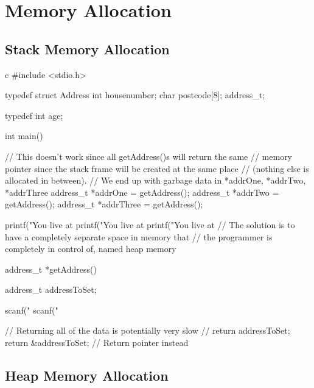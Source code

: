 \section{Memory Allocation}\label{sec:memory_allocation}

\subsection{Stack Memory Allocation}\label{sub:stack_memory_allocation}

\begin{code}{c}
    #include <stdio.h>

    typedef struct Address {
        int housenumber;
        char postcode[8];
    } address_t;

    typedef int age;

    int main() {
        // This doesn't work since all getAddress()s will return the same
        // memory pointer since the stack frame will be created at the same place
        // (nothing else is allocated in between).
        // We end up with garbage data in *addrOne, *addrTwo, *addrThree
        address_t *addrOne = getAddress();
        address_t *addrTwo = getAddress();
        address_t *addrThree = getAddress();

        printf("You live at %
        printf("You live at %
        printf("You live at %
        // The solution is to have a completely separate space in memory that
        // the programmer is completely in control of, named heap memory
    }

    address_t *getAddress() {
        address_t addressToSet;

        scanf("%
        scanf("%

        // Returning all of the data is potentially very slow
        // return addressToSet; 
        return &addressToSet; // Return pointer instead
    }
\end{code}

\subsection{Heap Memory Allocation}\label{sub:heap_memory_allocation}

